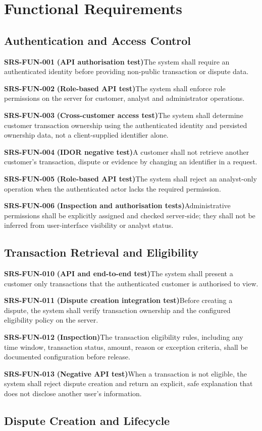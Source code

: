 \documentclass[11pt,a4paper]{article}
\newcommand{\req}[3]{%
    \par\noindent\textbf{\color{ADGBlue}#1}\quad
    \textbf{(#3)}\enspace #2\par\smallskip
}
\begin{document}
\section{Functional Requirements}

\subsection{Authentication and Access Control}

\req{SRS-FUN-001}{The system shall require an authenticated identity before providing non-public transaction or dispute data.}{API authorisation test}
\req{SRS-FUN-002}{The system shall enforce role permissions on the server for customer, analyst and administrator operations.}{Role-based API test}
\req{SRS-FUN-003}{The system shall determine customer transaction ownership using the authenticated identity and persisted ownership data, not a client-supplied identifier alone.}{Cross-customer access test}
\req{SRS-FUN-004}{A customer shall not retrieve another customer's transaction, dispute or evidence by changing an identifier in a request.}{IDOR negative test}
\req{SRS-FUN-005}{The system shall reject an analyst-only operation when the authenticated actor lacks the required permission.}{Role-based API test}
\req{SRS-FUN-006}{Administrative permissions shall be explicitly assigned and checked server-side; they shall not be inferred from user-interface visibility or analyst status.}{Inspection and authorisation tests}

\subsection{Transaction Retrieval and Eligibility}

\req{SRS-FUN-010}{The system shall present a customer only transactions that the authenticated customer is authorised to view.}{API and end-to-end test}
\req{SRS-FUN-011}{Before creating a dispute, the system shall verify transaction ownership and the configured eligibility policy on the server.}{Dispute creation integration test}
\req{SRS-FUN-012}{The transaction eligibility rules, including any time window, transaction status, amount, reason or exception criteria, shall be documented configuration before release.}{Inspection}
\req{SRS-FUN-013}{When a transaction is not eligible, the system shall reject dispute creation and return an explicit, safe explanation that does not disclose another user's information.}{Negative API test}

\subsection{Dispute Creation and Lifecycle}
\end{document}
